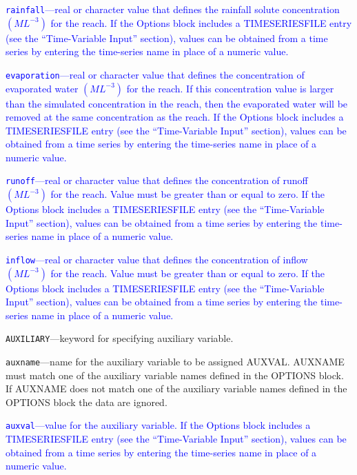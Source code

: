 \begin{description}
\item \textcolor{blue}{\texttt{rainfall}---real or character value that defines the rainfall solute concentration $(ML^{-3})$ for the reach. If the Options block includes a TIMESERIESFILE entry (see the ``Time-Variable Input'' section), values can be obtained from a time series by entering the time-series name in place of a numeric value.}

\item \textcolor{blue}{\texttt{evaporation}---real or character value that defines the concentration of evaporated water $(ML^{-3})$ for the reach. If this concentration value is larger than the simulated concentration in the reach, then the evaporated water will be removed at the same concentration as the reach.  If the Options block includes a TIMESERIESFILE entry (see the ``Time-Variable Input'' section), values can be obtained from a time series by entering the time-series name in place of a numeric value.}

\item \textcolor{blue}{\texttt{runoff}---real or character value that defines the concentration of runoff $(ML^{-3})$ for the reach. Value must be greater than or equal to zero. If the Options block includes a TIMESERIESFILE entry (see the ``Time-Variable Input'' section), values can be obtained from a time series by entering the time-series name in place of a numeric value.}

\item \textcolor{blue}{\texttt{inflow}---real or character value that defines the concentration of inflow $(ML^{-3})$ for the reach. Value must be greater than or equal to zero. If the Options block includes a TIMESERIESFILE entry (see the ``Time-Variable Input'' section), values can be obtained from a time series by entering the time-series name in place of a numeric value.}

\item \texttt{AUXILIARY}---keyword for specifying auxiliary variable.

\item \texttt{auxname}---name for the auxiliary variable to be assigned AUXVAL.  AUXNAME must match one of the auxiliary variable names defined in the OPTIONS block. If AUXNAME does not match one of the auxiliary variable names defined in the OPTIONS block the data are ignored.

\item \textcolor{blue}{\texttt{auxval}---value for the auxiliary variable. If the Options block includes a TIMESERIESFILE entry (see the ``Time-Variable Input'' section), values can be obtained from a time series by entering the time-series name in place of a numeric value.}

\end{description}

